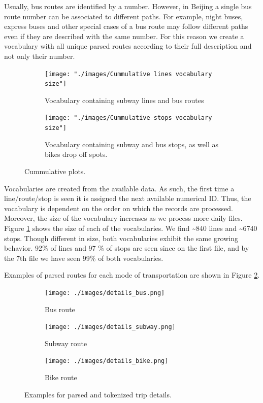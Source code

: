 \documentclass{article}
\begin{document}
Usually, bus routes are identified by a number. However, in Beijing a single bus route number can be associated to different paths. For example, night buses, express buses and other special cases of a bus route may follow different paths even if they are described with the same number. For this reason we create a vocabulary with all unique parsed routes according to their full description and not only their number.  

\begin{figure}[H]
  \centering
  \begin{subfigure}[b]{.7\textwidth}
  	\centering
  	\texttt{[image: "./images/Cummulative lines vocabulary size"]}
  	\caption{Vocabulary containing subway lines and bus routes}
  \end{subfigure}
  \begin{subfigure}[b]{.7\textwidth}
  	\centering
  	\texttt{[image: "./images/Cummulative stops vocabulary size"]}
  	\caption{Vocabulary containing subway and bus stops, as well as bikes drop off spots.}
  \end{subfigure}
  \caption{Cummulative plots.}
  \label{fig:preprocessing/cummulativeVoc}
\end{figure}

Vocabularies are created from the available data. As such, the first time a line/route/stop is seen it is assigned the next available numerical ID. Thus, the vocabulary is dependent on the order on which the records are processed. Moreover, the size of the vocabulary increases as we process more daily files. Figure \ref{fig:preprocessing/cummulativeVoc} shows the size of each of the vocabularies. We find  \textasciitilde 840 lines and \textasciitilde 6740 stops. Though different in size, both vocabularies exhibit the same growing behavior. 92\% of lines and 97 \% of stops are seen since on the first file, and by the 7th file we have seen 99\% of both vocabularies.

Examples of parsed routes for each mode of transportation are shown in Figure \ref{fig:preprocessing/parsed_routes}. %

\begin{figure}[H]
  \centering
  \begin{subfigure}[b]{\textwidth}
  	\centering
  	\texttt{[image: ./images/details\_bus.png]}
  	\caption{Bus route}
  \end{subfigure}
  \begin{subfigure}[b]{.75\textwidth}
  	\centering
  	\texttt{[image: ./images/details\_subway.png]}
  	\caption{Subway route}
  \end{subfigure}
    \begin{subfigure}[b]{.7\textwidth}
  	\centering
  	\texttt{[image: ./images/details\_bike.png]}
  	\caption{Bike route}
  \end{subfigure}
  \caption{Examples for parsed and tokenized trip details.}
  	\label{fig:preprocessing/parsed_routes}
\end{figure}
\end{document}
